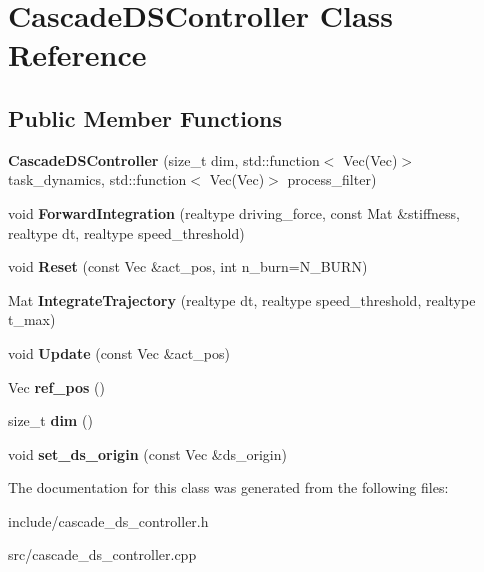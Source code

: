 \hypertarget{classCascadeDSController}{\section{Cascade\+D\+S\+Controller Class Reference}
\label{classCascadeDSController}
}
\subsection*{Public Member Functions}
\begin{DoxyCompactItemize}
\item 
\hypertarget{classCascadeDSController_a291701f57a7fc001d2dbc0edef0c65f2}{{\bfseries Cascade\+D\+S\+Controller} (size\+\_\+t dim, std\+::function$<$ Vec(Vec)$>$ task\+\_\+dynamics, std\+::function$<$ Vec(Vec)$>$ process\+\_\+filter)}\label{classCascadeDSController_a291701f57a7fc001d2dbc0edef0c65f2}

\item 
\hypertarget{classCascadeDSController_a69aef025bd5c8bbea34958b649fb0452}{void {\bfseries Forward\+Integration} (realtype driving\+\_\+force, const Mat \&stiffness, realtype dt, realtype speed\+\_\+threshold)}\label{classCascadeDSController_a69aef025bd5c8bbea34958b649fb0452}

\item 
\hypertarget{classCascadeDSController_a1e51fe3a3652228c4cfb50cbcce98451}{void {\bfseries Reset} (const Vec \&act\+\_\+pos, int n\+\_\+burn=N\+\_\+\+B\+U\+R\+N)}\label{classCascadeDSController_a1e51fe3a3652228c4cfb50cbcce98451}

\item 
\hypertarget{classCascadeDSController_a69cb5e84d7f34c628627819dce8ead36}{Mat {\bfseries Integrate\+Trajectory} (realtype dt, realtype speed\+\_\+threshold, realtype t\+\_\+max)}\label{classCascadeDSController_a69cb5e84d7f34c628627819dce8ead36}

\item 
\hypertarget{classCascadeDSController_ae19aca7dfdac51d61bdf61d71c41af71}{void {\bfseries Update} (const Vec \&act\+\_\+pos)}\label{classCascadeDSController_ae19aca7dfdac51d61bdf61d71c41af71}

\item 
\hypertarget{classCascadeDSController_a7d099821e73094bf63fa3d8bd776cdcf}{Vec {\bfseries ref\+\_\+pos} ()}\label{classCascadeDSController_a7d099821e73094bf63fa3d8bd776cdcf}

\item 
\hypertarget{classCascadeDSController_ac179e9eccd277656fc7dcd6ffb7baf78}{size\+\_\+t {\bfseries dim} ()}\label{classCascadeDSController_ac179e9eccd277656fc7dcd6ffb7baf78}

\item 
\hypertarget{classCascadeDSController_a090f174c8f1f7f91733cf694e3f96833}{void {\bfseries set\+\_\+ds\+\_\+origin} (const Vec \&ds\+\_\+origin)}\label{classCascadeDSController_a090f174c8f1f7f91733cf694e3f96833}

\end{DoxyCompactItemize}


The documentation for this class was generated from the following files\+:\begin{DoxyCompactItemize}
\item 
include/cascade\+\_\+ds\+\_\+controller.\+h\item 
src/cascade\+\_\+ds\+\_\+controller.\+cpp\end{DoxyCompactItemize}
